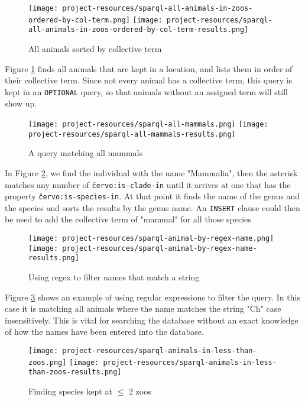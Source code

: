\documentclass[a4paper]{article}
\begin{document}
\begin{figure}[H]
	\centering
	\texttt{[image: project-resources/sparql-all-animals-in-zoos-ordered-by-col-term.png]}
	\texttt{[image: project-resources/sparql-all-animals-in-zoos-ordered-by-col-term-results.png]}
	\caption{All animals sorted by collective term}
	\label{fig:sparql-all-animals-in-zoos-ordered-by-col-term}
\end{figure}

Figure \ref{fig:sparql-all-animals-in-zoos-ordered-by-col-term} finds all animals that are kept in a location, and lists them in order of their collective term. Since not every animal has a collective term, this query is kept in an \texttt{OPTIONAL} query, so that animals without an assigned term will still show up.

\begin{figure}[H]
	\centering
	\texttt{[image: project-resources/sparql-all-mammals.png]}
	\texttt{[image: project-resources/sparql-all-mammals-results.png]}
	\caption{A query matching all mammals}
	\label{fig:sparql-all-mammals}
\end{figure}

In Figure \ref{fig:sparql-all-mammals}, we find the individual with the name "Mammalia", then the asterisk matches any number of \texttt{\^cervo:is-clade-in} until it arrives at one that has the property \texttt{\^cervo:is-species-in}. At that point it finds the name of the genus and the species and sorts the results by the genus name. An \texttt{INSERT} clause could then be used to add the collective term of "mammal" for all those species

\begin{figure}[H]
	\centering
	\texttt{[image: project-resources/sparql-animal-by-regex-name.png]}
	\texttt{[image: project-resources/sparql-animal-by-regex-name-results.png]}
	\caption{Using regex to filter names that match a string}
	\label{fig:sparql-animal-by-regex-name}
\end{figure}

Figure \ref{fig:sparql-animal-by-regex-name} shows an example of using regular expressions to filter the query. In this case it is matching all animals where the name matches the string "Ch" case insensitively. This is vital for searching the database without an exact knowledge of how the names have been entered into the database.

\begin{figure}[H]
	\centering
	\texttt{[image: project-resources/sparql-animals-in-less-than-zoos.png]}
	\texttt{[image: project-resources/sparql-animals-in-less-than-zoos-results.png]}
	\caption{Finding species kept at $\leq$ 2 zoos}
	\label{fig:sparql-rare-animals}
\end{figure}
\end{document}
